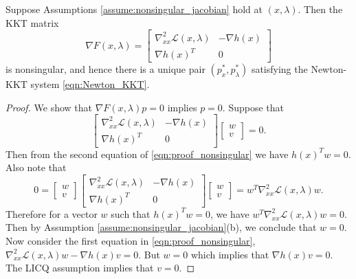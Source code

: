 \documentclass[11pt,a4paper]{article}
\begin{document}
\begin{prop}\label{prop:nonsingular_jacobian}
Suppose Assumptions \ref{assume:nonsingular_jacobian} hold at $(x,\lambda)$. Then the KKT matrix 
\begin{equation*}
\nabla F(x,\lambda) = \left[
\begin{array}{cc} 
\nabla^2_{xx} \mathcal{L}(x,\lambda) & -\nabla h(x) \\ 
\nabla h(x)^T & 0
\end{array} \right]
\end{equation*}
is nonsingular, and hence there is a unique pair $(p_x^*,p_\lambda^*)$ satisfying the Newton-KKT system \eqref{eqn:Newton_KKT}.
\end{prop}

\begin{proof}
We show that $\nabla F(x,\lambda) p = 0$ implies $p = 0$. Suppose that
\begin{equation}
\left[
\begin{array}{cc} 
\nabla^2_{xx} \mathcal{L}(x,\lambda) & -\nabla h(x) \\ 
\nabla h(x)^T & 0
\end{array} \right]
\left[\begin{array}{c} w \\ v \end{array}\right] = 0.\label{eqn:proof_nonsingular}
\end{equation}
Then from the second equation of \eqref{eqn:proof_nonsingular} we have $h(x)^Tw = 0$. Also note that
\begin{equation*}
0 = \left[\begin{array}{c} w \\ v \end{array}\right]
\left[
\begin{array}{cc} 
\nabla^2_{xx} \mathcal{L}(x,\lambda) & -\nabla h(x) \\ 
\nabla h(x)^T & 0
\end{array} \right]
\left[\begin{array}{c} w \\ v \end{array}\right] = w^T\nabla_{xx}^2\mathcal{L}(x,\lambda)w.
\end{equation*}
Therefore for a vector $w$ such that $h(x)^Tw = 0$, we have $w^T\nabla^2_{xx} \mathcal{L}(x,\lambda)w = 0$. Then by Assumption \ref{assume:nonsingular_jacobian}(b), we conclude that $w = 0$. Now consider the first equation in \eqref{eqn:proof_nonsingular}, $\nabla^2_{xx} \mathcal{L}(x,\lambda)w-\nabla h(x)v = 0$. But $w = 0$ which implies that $\nabla h(x) v = 0$. The LICQ assumption implies that $v = 0$.
\end{proof}
\end{document}
